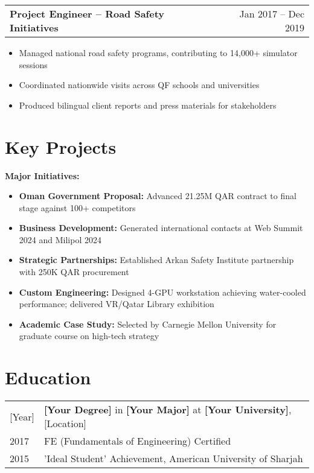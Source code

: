 \documentclass[a4paper,12pt]{article}
\makeatletter
\newenvironment{joblong}[2]
    {
    \begin{tabularx}{\linewidth}{@{}l X r@{}}
    \textbf{#1} & \hfill &  #2 \\[3.75pt]
    \end{tabularx}
    \begin{minipage}[t]{\linewidth}
    \begin{itemize}[nosep,after=\strut, leftmargin=1em, itemsep=3pt,label=--]
    }
    {
    \end{itemize}
    \end{minipage}
    }
\makeatother
\begin{document}
\begin{joblong}{Project Engineer -- Road Safety Initiatives}{Jan 2017 -- Dec 2019}
\item Managed national road safety programs, contributing to 14,000+ simulator sessions
\item Coordinated nationwide visits across QF schools and universities
\item Produced bilingual client reports and press materials for stakeholders
\end{joblong}


\section{Key Projects}

\textbf{Major Initiatives:}
\begin{itemize}[nosep,after=\strut, leftmargin=1em, itemsep=2pt,label=--]
\item \textbf{Oman Government Proposal:} Advanced 21.25M QAR contract to final stage against 100+ competitors
\item \textbf{Business Development:} Generated international contacts at Web Summit 2024 and Milipol 2024
\item \textbf{Strategic Partnerships:} Established Arkan Safety Institute partnership with 250K QAR procurement
\item \textbf{Custom Engineering:} Designed 4-GPU workstation achieving water-cooled performance; delivered VR/Qatar Library exhibition
\item \textbf{Academic Case Study:} Selected by Carnegie Mellon University for graduate course on high-tech strategy
\end{itemize}

\section{Education}
\begin{tabularx}{\linewidth}{@{}l X@{}}
[Year] & \textbf{[Your Degree]} in \textbf{[Your Major]} at \textbf{[Your University]}, [Location] \\
2017 & FE (Fundamentals of Engineering) Certified \\
2015 & 'Ideal Student' Achievement, American University of Sharjah \\
\end{tabularx}
\end{document}
